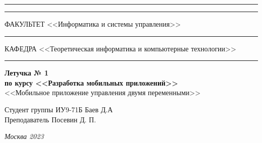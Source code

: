 \documentclass[a4paper, 14pt]{extarticle}
\begin{document}
\begin{titlepage}
\vspace{-25pt}
\hspace{-35pt}\rule{\textwidth}{2.3pt}

\vspace*{-20.3pt}
\hspace{-35pt}\rule{\textwidth}{0.4pt}

\vspace{1.5ex}
\hspace{-35pt} \noindent \small ФАКУЛЬТЕТ\hspace{80pt} <<Информатика и системы управления>>

\vspace*{-16pt}
\hspace{47pt}\rule{0.83\textwidth}{0.4pt}

\vspace{0.5ex}
\hspace{-35pt} \noindent \small КАФЕДРА\hspace{50pt} <<Теоретическая информатика и компьютерные технологии>>

\vspace*{-16pt}
\hspace{30pt}\rule{0.866\textwidth}{0.4pt}
  
\vspace{11em}

\begin{center}
\Large {\bf Летучка № 1 } \\ 
\large {\bf по курсу <<Разработка мобильных приложений>>} \\
\large <<Мобильное приложение управления двумя переменными>> 
\end{center}\normalsize

\vspace{8em}


\begin{flushright}
  {Студент группы ИУ9-71Б Баев Д.А \hspace*{15pt}\\ 
  \vspace{2ex}
  Преподаватель Посевин Д. П.\hspace*{15pt}}
\end{flushright}

\bigskip

\vfill
 

\begin{center}
\textsl{Москва 2023}
\end{center}
\end{titlepage}
\end{document}
